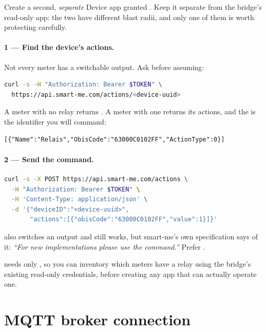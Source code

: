 Create a second, \emph{separate} Device app granted . Keep it
separate from the bridge's read-only app: the two have different blast radii, and only one
of them is worth protecting carefully.

\paragraph{1 — Find the device's actions.} Not every meter has a switchable output. Ask
before assuming:

\begin{lstlisting}[language=bash]
curl -s -H "Authorization: Bearer $TOKEN" \
  https://api.smart-me.com/actions/<device-uuid>
\end{lstlisting}

A meter with no relay returns \code{[]}. A meter with one returns its actions, and the
\code{ObisCode} is the identifier you will command:

\begin{lstlisting}
[{"Name":"Relais","ObisCode":"63000C0102FF","ActionType":0}]
\end{lstlisting}

\paragraph{2 — Send the command.}

\begin{lstlisting}[language=bash]
curl -s -X POST https://api.smart-me.com/actions \
  -H "Authorization: Bearer $TOKEN" \
  -H 'Content-Type: application/json' \
  -d '{"deviceID":"<device-uuid>",
       "actions":[{"obisCode":"63000C0102FF","value":1}]}'
\end{lstlisting}

\begin{note}
\code{PUT /Devices/\{id\}} also switches an output and still works, but smart-me's own
specification says of it: \emph{“For new implementations please use the 
command.”} Prefer .
\end{note}

\begin{tip}
 needs only , so you can inventory which meters
have a relay using the bridge's existing read-only credentials, before creating any app
that can actually operate one.
\end{tip}

\section{MQTT broker connection}
\label{sec:broker-config}


